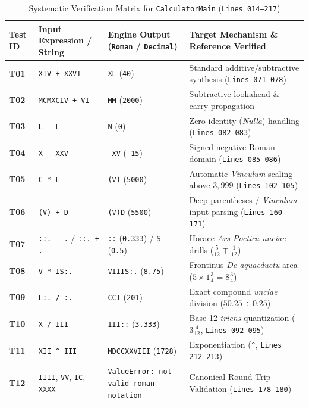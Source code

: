 \documentclass[11pt, a4paper]{article}
\begin{document}
\begin{table}[h!]
\centering
\caption{Systematic Verification Matrix for \texttt{CalculatorMain} (\texttt{Lines 014--217})}
\label{tab:fullmatrix}
\footnotesize
\begin{tabular}{@{}llll@{}}
\toprule
\textbf{Test ID} & \textbf{Input Expression / String} & \textbf{Engine Output (\texttt{Roman} / \texttt{Decimal})} & \textbf{Target Mechanism \& Reference Verified} \\ \midrule
\textbf{T01} & \texttt{XIV + XXVI} & \texttt{XL} (\texttt{40}) & Standard additive/subtractive synthesis (\texttt{Lines 071--078}) \cite{steins2022, lewis2019} \\
\textbf{T02} & \texttt{MCMXCIV + VI} & \texttt{MM} (\texttt{2000}) & Subtractive lookahead \& carry propagation \cite{geeksforgeeks2021, steins2022} \\
\textbf{T03} & \texttt{L - L} & \texttt{N} (\texttt{0}) & Zero identity (\textit{Nulla}) handling (\texttt{Lines 082--083}) \\
\textbf{T04} & \texttt{X - XXV} & \texttt{-XV} (\texttt{-15}) & Signed negative Roman domain (\texttt{Lines 085--086}) \\
\textbf{T05} & \texttt{C * L} & \texttt{(V)} (\texttt{5000}) & Automatic \textit{Vinculum} scaling above $3,999$ (\texttt{Lines 102--105}) \cite{lewis2019} \\
\textbf{T06} & \texttt{(V) + D} & \texttt{(V)D} (\texttt{5500}) & Deep parentheses / \textit{Vinculum} input parsing (\texttt{Lines 160--171}) \cite{lewis2019} \\
\textbf{T07} & \texttt{::. - .} / \texttt{::. + .} & \texttt{::} (\texttt{0.333}) / \texttt{S} (\texttt{0.5}) & Horace \textit{Ars Poetica} \textit{unciae} drills ($\frac{5}{12} \mp \frac{1}{12}$) \cite{maher2001} \\
\textbf{T08} & \texttt{V * IS:.} & \texttt{VIIIS:.} (\texttt{8.75}) & Frontinus \textit{De aquaeductu} area ($5 \times 1\frac{3}{4} = 8\frac{3}{4}$) \cite{maher2001} \\
\textbf{T09} & \texttt{L:. / :.} & \texttt{CCI} (\texttt{201}) & Exact compound \textit{unciae} division ($50.25 \div 0.25$) \cite{maher2001} \\
\textbf{T10} & \texttt{X / III} & \texttt{III::} (\texttt{3.333}) & Base-12 \textit{triens} quantization ($3\frac{4}{12}$, \texttt{Lines 092--095}) \cite{maher2001} \\
\textbf{T11} & \texttt{XII \^{} III} & \texttt{MDCCXXVIII} (\texttt{1728}) & Exponentiation (\texttt{\^{}}, \texttt{Lines 212--213}) \\
\textbf{T12} & \texttt{IIII}, \texttt{VV}, \texttt{IC}, \texttt{XXXX} & \texttt{ValueError: not valid roman notation} & Canonical Round-Trip Validation (\texttt{Lines 178--180}) \cite{lewis2019} \\ \bottomrule
\end{tabular}
\end{table}
\end{document}
